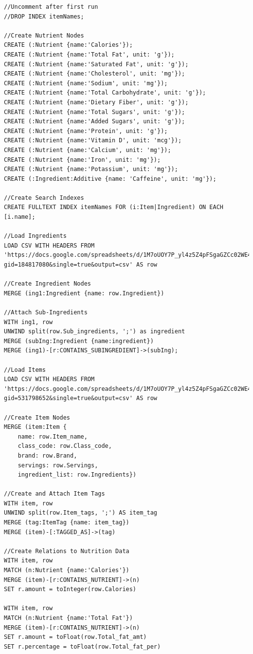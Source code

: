 \documentclass[thesis]{fputhesis}
\begin{document}
\begin{body}
\begin{appendices}
\begin{lstlisting}[language=Cypher]
//Uncomment after first run 
//DROP INDEX itemNames;

//Create Nutrient Nodes
CREATE (:Nutrient {name:'Calories'});
CREATE (:Nutrient {name:'Total Fat', unit: 'g'});
CREATE (:Nutrient {name:'Saturated Fat', unit: 'g'});
CREATE (:Nutrient {name:'Cholesterol', unit: 'mg'});
CREATE (:Nutrient {name:'Sodium', unit: 'mg'});
CREATE (:Nutrient {name:'Total Carbohydrate', unit: 'g'});
CREATE (:Nutrient {name:'Dietary Fiber', unit: 'g'});
CREATE (:Nutrient {name:'Total Sugars', unit: 'g'});
CREATE (:Nutrient {name:'Added Sugars', unit: 'g'});
CREATE (:Nutrient {name:'Protein', unit: 'g'});
CREATE (:Nutrient {name:'Vitamin D', unit: 'mcg'});
CREATE (:Nutrient {name:'Calcium', unit: 'mg'});
CREATE (:Nutrient {name:'Iron', unit: 'mg'});
CREATE (:Nutrient {name:'Potassium', unit: 'mg'});
CREATE (:Ingredient:Additive {name: 'Caffeine', unit: 'mg'});

//Create Search Indexes
CREATE FULLTEXT INDEX itemNames FOR (i:Item|Ingredient) ON EACH [i.name];

//Load Ingredients
LOAD CSV WITH HEADERS FROM 'https://docs.google.com/spreadsheets/d/1M7oUOY7P_yl4z5Z4pFSgaGZCc02WE4VKXe6nSkH_1LI/pub?gid=184817080&single=true&output=csv' AS row

//Create Ingredient Nodes
MERGE (ing1:Ingredient {name: row.Ingredient})

//Attach Sub-Ingredients
WITH ing1, row
UNWIND split(row.Sub_ingredients, ';') as ingredient
MERGE (subIng:Ingredient {name:ingredient})
MERGE (ing1)-[r:CONTAINS_SUBINGREDIENT]->(subIng);

//Load Items
LOAD CSV WITH HEADERS FROM 'https://docs.google.com/spreadsheets/d/1M7oUOY7P_yl4z5Z4pFSgaGZCc02WE4VKXe6nSkH_1LI/pub?gid=531798652&single=true&output=csv' AS row

//Create Item Nodes
MERGE (item:Item {
    name: row.Item_name, 
    class_code: row.Class_code, 
    brand: row.Brand, 
    servings: row.Servings, 
    ingredient_list: row.Ingredients})

//Create and Attach Item Tags
WITH item, row
UNWIND split(row.Item_tags, ';') AS item_tag
MERGE (tag:ItemTag {name: item_tag})
MERGE (item)-[:TAGGED_AS]->(tag)

//Create Relations to Nutrition Data
WITH item, row
MATCH (n:Nutrient {name:'Calories'})
MERGE (item)-[r:CONTAINS_NUTRIENT]->(n)
SET r.amount = toInteger(row.Calories)

WITH item, row
MATCH (n:Nutrient {name:'Total Fat'})
MERGE (item)-[r:CONTAINS_NUTRIENT]->(n)
SET r.amount = toFloat(row.Total_fat_amt)
SET r.percentage = toFloat(row.Total_fat_per)


\end{lstlisting}
\end{appendices}
\end{body}
\end{document}
